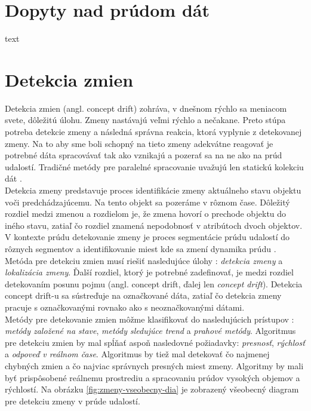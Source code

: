 \section{Dopyty nad prúdom dát}
text


\section{Detekcia zmien}
Detekcia zmien (angl. concept drift) zohráva, v dnešnom rýchlo sa meniacom svete, dôležitú úlohu. Zmeny nastávajú veľmi rýchlo a nečakane. Preto stúpa potreba detekcie zmeny a následná správna reakcia, ktorá vyplynie z detekovanej zmeny. Na to aby sme boli schopný na tieto zmeny adekvátne reagovať je potrebné dáta spracovávať tak ako vznikajú a pozerať sa na ne ako na prúd udalostí. Tradičné metódy pre paralelné spracovanie uvažujú len statickú kolekciu dát \citep{tran2014change}.\\

Detekcia zmeny predstavuje proces identifikácie zmeny aktuálneho stavu objektu voči predchádzajúcemu. Na tento objekt sa pozeráme v rôznom čase. Dôležitý rozdiel medzi zmenou a rozdielom je, že zmena hovorí o prechode objektu do iného stavu, zatiaľ čo rozdiel znamená nepodobnosť v atribútoch dvoch objektov. V kontexte prúdu detekovanie zmeny je proces segmentácie prúdu udalostí do rôznych segmentov a identifikovanie miest kde sa zmení dynamika prúdu \citep{ross2009online}. Metóda pre detekciu zmien musí riešiť nasledujúce úlohy \citep{tran2014change}: \textit{detekcia zmeny} a \textit{lokalizácia zmeny}. Ďalší rozdiel, ktorý je potrebné zadefinovať, je medzi rozdiel detekovaním posunu pojmu (angl. concept drift, ďalej len \textit{concept drift}). Detekcia concept drift-u sa sústreďuje na označkované dáta, zatiaľ čo detekcia zmeny pracuje s označkovanými rovnako ako s neoznačkovanými dátami.\\

Metódy pre detekovanie zmien môžme klasifikovať do nasledujúcich prístupov \citep{liu2010mining}: \textit{metódy založené na stave}, \textit{metódy sledujúce trend} a \textit{prahové metódy}. Algoritmus pre detekciu zmien by mal spĺňať aspoň nasledovné požiadavky: \textit{presnosť}, \textit{rýchlosť} a \textit{odpoveď v reálnom čase}. Algoritmus by tiež mal detekovať čo najmenej chybných zmien a čo najviac správnych presných miest zmeny. Algoritmy by mali byť prispôsobené reálnemu prostrediu a spracovaniu prúdov vysokých objemov a rýchlostí. Na obrázku \ref{fig:zmeny-vseobecny-dia} je zobrazený všeobecný diagram pre detekciu zmeny v prúde udalostí.

